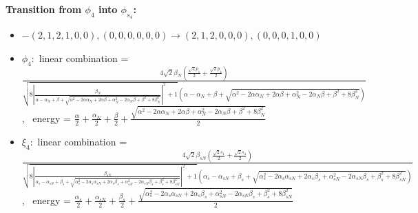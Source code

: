 \documentclass[12pt,a4paper]{article}
\begin{document}
        \noindent\textbf{Transition from $\phi_{4}$ into $\phi_{s_{4}}$:}
        \begin{itemize}
            \item $- (2, 1, 2, 1, 0, 0), (0, 0, 0, 0, 0, 0) \rightarrow (2, 1, 2, 0, 0, 0), (0, 0, 0, 1, 0, 0)$
        
            \item $\phi_{4}:$ linear combination = $\frac{4 \sqrt{2} \beta_{N} \left(\frac{\sqrt{2} p_{1}}{2} + \frac{\sqrt{2} p_{4}}{2}\right)}{\sqrt{8 \left|{\frac{\beta_{N}}{\alpha - \alpha_{N} + \beta + \sqrt{\alpha^{2} - 2 \alpha \alpha_{N} + 2 \alpha \beta + \alpha_{N}^{2} - 2 \alpha_{N} \beta + \beta^{2} + 8 \beta_{N}^{2}}}}\right|^{2} + 1} \left(\alpha - \alpha_{N} + \beta + \sqrt{\alpha^{2} - 2 \alpha \alpha_{N} + 2 \alpha \beta + \alpha_{N}^{2} - 2 \alpha_{N} \beta + \beta^{2} + 8 \beta_{N}^{2}}\right)}$, \
            energy = $\frac{\alpha}{2} + \frac{\alpha_{N}}{2} + \frac{\beta}{2} + \frac{\sqrt{\alpha^{2} - 2 \alpha \alpha_{N} + 2 \alpha \beta + \alpha_{N}^{2} - 2 \alpha_{N} \beta + \beta^{2} + 8 \beta_{N}^{2}}}{2}$
            
            \item $\xi_{4}:$ linear combination = $\frac{4 \sqrt{2} \beta_{s N} \left(\frac{\sqrt{2} s_{1}}{2} + \frac{\sqrt{2} s_{4}}{2}\right)}{\sqrt{8 \left|{\frac{\beta_{s N}}{\alpha_{s} - \alpha_{s N} + \beta_{s} + \sqrt{\alpha_{s}^{2} - 2 \alpha_{s} \alpha_{s N} + 2 \alpha_{s} \beta_{s} + \alpha_{s N}^{2} - 2 \alpha_{s N} \beta_{s} + \beta_{s}^{2} + 8 \beta_{s N}^{2}}}}\right|^{2} + 1} \left(\alpha_{s} - \alpha_{s N} + \beta_{s} + \sqrt{\alpha_{s}^{2} - 2 \alpha_{s} \alpha_{s N} + 2 \alpha_{s} \beta_{s} + \alpha_{s N}^{2} - 2 \alpha_{s N} \beta_{s} + \beta_{s}^{2} + 8 \beta_{s N}^{2}}\right)}$, \
            energy = $\frac{\alpha_{s}}{2} + \frac{\alpha_{s N}}{2} + \frac{\beta_{s}}{2} + \frac{\sqrt{\alpha_{s}^{2} - 2 \alpha_{s} \alpha_{s N} + 2 \alpha_{s} \beta_{s} + \alpha_{s N}^{2} - 2 \alpha_{s N} \beta_{s} + \beta_{s}^{2} + 8 \beta_{s N}^{2}}}{2}$
            

\end{itemize}
\end{document}
